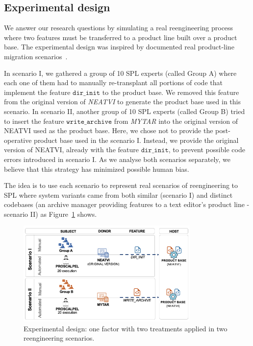 \normalsize\subsection{Experimental design}

We answer our research questions by simulating a real reengineering process where two features must be transferred to a product line built over a product base. The experimental design was inspired by documented real product-line migration scenarios~\cite{Laguna2013, Assuncao2017}. 

In scenario I, we gathered a group of 10 SPL experts (called Group A) where each one of them had to manually re-transplant all portions of code that implement the feature $\texttt{dir\_init}$ to the product base. We removed this feature from the original version of \emph{NEATVI} to generate the product base used in this scenario. In scenario II, another group of 10 SPL experts (called Group B) tried to insert the feature $\texttt{write\_archive}$ from \emph{MYTAR} into the original version of NEATVI used as the product base. Here, we chose not to provide the post-operative product base used in the scenario I. Instead, we provide the original version of NEATVI, already with the feature $\texttt{dir\_init}$, to prevent possible code errors introduced in scenario I. As we analyse both scenarios separately, we believe that this strategy has minimized possible human bias.

The idea is to use each scenario to represent real scenarios of reengineering to SPL where system variants came from both similar (scenario I) and distinct codebases (an archive manager providing features to a text editor's product line - scenario II) as Figure~\ref{fig:experiment_design} shows.

\begin{figure}[t]
	\centering \includegraphics[width=0.8\textwidth]{images/experiment_design8.png}
	\centering 
	\caption{Experimental design: one factor with two treatments applied in two reengineering scenarios.}
	\label{fig:experiment_design}
\end{figure} 

